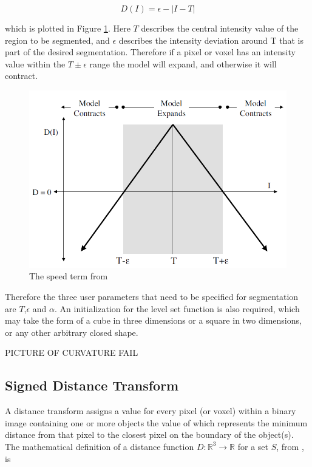 	\begin{equation}
	D(I)= \epsilon - |I-T|
	\label{eq:dataterm}
	\end{equation}

which is plotted in Figure \ref{fig:speedterm}. Here $T$ describes the central intensity value of the region to be segmented, and $\epsilon$ describes the intensity deviation around T that is part of the desired segmentation. Therefore if a pixel or voxel has an intensity value within the $T\pm\epsilon$ range the model will expand, and otherwise it will contract. 

	\begin{figure}[h]
		\centering
			\includegraphics[scale=0.3]{images/speedterm.png}
		\caption{The speed term from \cite{gist}}
		\label{fig:speedterm}
	\end{figure}

Therefore the three user parameters that need to be specified for segmentation are $T$,$\epsilon$ and $\alpha$. An initialization for the level set function is also required, which may take the form of a cube in three dimensions or a square in two dimensions, or any other arbitrary closed shape. 

PICTURE OF CURVATURE FAIL


	\subsection{Signed Distance Transform}
A distance transform assigns a value for every pixel (or voxel) within a binary image containing one or more objects the value of which represents the minimum distance from that pixel to the closest pixel on the boundary of the object(s). The mathematical definition of a distance function $D:\mathbb{R}^3 \rightarrow \mathbb{R}$ for a set $S$, from \cite{oshersethian}, is
	
